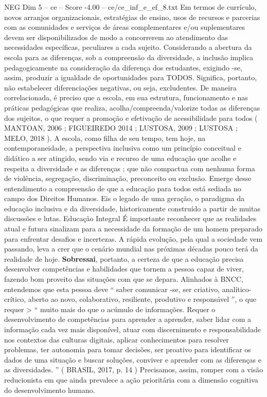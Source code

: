 \begin{textsample}{NEG Dim 5 – ce – Score -4.00 – ce/ce\_inf\_e\_ef\_8.txt}
Em termos de currículo, novos arranjos organizacionais, estratégias de ensino, usos de recursos e parcerias com as comunidades e serviços de áreas complementares e/ou suplementares devem ser disponibilizados de modo a concorrerem ao atendimento das necessidades específicas, peculiares a cada sujeito.
Considerando a abertura da escola para as diferenças, sob a compreensão da diversidade, a inclusão implica pedagogicamente na consideração da diferença dos estudantes, exigindo -se, assim, produzir a igualdade de oportunidades para TODOS.
Significa, portanto, não estabelecer diferenciações negativas, ou seja, excludentes.
De maneira correlacionada, é preciso que a escola, em sua estrutura, funcionamento e nas práticas pedagógicas que realiza, acolha/compreenda/valorize todas as diferenças dos sujeitos, o que requer a promoção e efetivação de acessibilidade para todos ( MANTOAN, 2006 ; FIGUEIREDO 2014 ; LUSTOSA, 2009 ; LUSTOSA ; MELO, 2018 ).
A escola, como filha de seu tempo, tem hoje, na contemporaneidade, a perspectiva inclusiva como um princípio conceitual e didático a ser atingido, sendo via e recurso de uma educação que acolhe e respeita a diversidade e as diferenças ; que não compactua com nenhuma forma de violência, segregação, discriminação, preconceito ou exclusão.
Emerge desse entendimento a compreensão de que a educação para todos está sediada no campo dos Direitos Humanos.
Eis o legado de uma geração, o paradigma da educação inclusiva e da diversidade, historicamente construído a partir de muitas discussões e lutas.
Educação Integral É importante reconhecer que as realidades atual e futura sinalizam para a necessidade da formação de um homem preparado para enfrentar desafios e incertezas.
A rápida evolução, pela qual a sociedade vem passando, leva a crer que o cenário mundial nas próximas décadas pouco terá da realidade de hoje. \textbf{Sobressai}, portanto, a certeza de que a educação precisa desenvolver competências e habilidades que tornem a pessoa capaz de viver, fazendo bom proveito das situações com que se depara.
Alinhados à BNCC, entendemos que esta pessoa deve “ saber comunicar -se, ser criativo, analítico-crítico, aberto ao novo, colaborativo, resiliente, produtivo e responsável ”, o que requer > “ muito mais do que o acúmulo de informações.
Requer o desenvolvimento de competências para aprender a aprender, saber lidar com a informação cada vez mais disponível, atuar com discernimento e responsabilidade nos contextos das culturas digitais, aplicar conhecimentos para resolver problemas, ter autonomia para tomar decisões, ser proativo para identificar os dados de uma situação e buscar soluções, conviver e aprender com as diferenças e as diversidades. ” ( BRASIL, 2017, p. 14 ) Precisamos, assim, romper com a visão reducionista em que ainda prevalece a ação prioritária com a dimensão cognitiva do desenvolvimento humano.

\end{textsample}
